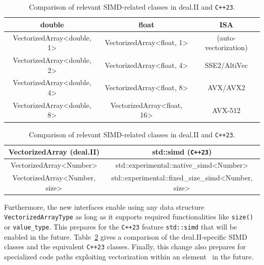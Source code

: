 \documentclass{ansarticle-preprint}
\begin{document}
\begin{table}
\caption{Supported vector lengths of the class \texttt{VectorizedArray} and
the corresponding instruction-set-architecture extensions. }\label{tab:vectorizedarray}
\centering
\begin{tabular}{ccc}
\toprule
\textbf{double} & \textbf{float} & \textbf{ISA}\\
\midrule
VectorizedArray<double, 1> & VectorizedArray<float, 1> & (auto-vectorization) \\
VectorizedArray<double, 2> & VectorizedArray<float, 4> & SSE2/AltiVec \\
VectorizedArray<double, 4> & VectorizedArray<float, 8> & AVX/AVX2 \\
VectorizedArray<double, 8> & VectorizedArray<float, 16> & AVX-512 \\
\bottomrule
\end{tabular}

\caption{Comparison of relevant SIMD-related classes in deal.II and \texttt{C++23}.}\label{tab:simd}
\centering
\begin{tabular}{cc}
\toprule
\textbf{VectorizedArray (deal.II)} & \textbf{std::simd (\texttt{C++23})} \\
\midrule
VectorizedArray<Number> & std::experimental::native\_simd<Number> \\
VectorizedArray<Number, size> & std::experimental::fixed\_size\_simd<Number, size> \\ \bottomrule
\end{tabular}
\end{table}

Furthermore, the new interfaces enable using any data structure
\texttt{VectorizedArrayType} as long as it supports required
functionalities like \texttt{size()} or \texttt{value\_type}. This prepares
for the \texttt{C++23} feature \texttt{std::simd} that will be enabled in the future.
Table~\ref{tab:simd} gives a comparison of the deal.II-specific SIMD classes and
the equivalent \texttt{C++23} classes. Finally, this change also prepares for specialized
code paths exploiting
vectorization within an element~\cite{KronbichlerKormann2019} in the future.

\end{document}
